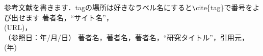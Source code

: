 \begin{thebibliography}{99}
 参考文献を書きます．tagの場所は好きなラベル名にすると\verb|\|cite\{tag\}で番号をよび出せます
 著者名，“サイト名”，\\(URL)，\\（参照日：年/月/日）
 著者名，著者名，著者名，“研究タイトル”，引用元，(年)
\end{thebibliography}
